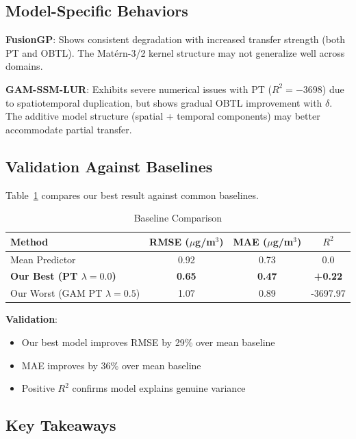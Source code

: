 \subsection{Model-Specific Behaviors}
\label{subsec:model_behaviors}

\textbf{FusionGP}: Shows consistent degradation with increased transfer strength (both PT and OBTL). The Matérn-3/2 kernel structure may not generalize well across domains.

\textbf{GAM-SSM-LUR}: Exhibits severe numerical issues with PT (\(R^2=-3698\)) due to spatiotemporal duplication, but shows gradual OBTL improvement with \(\delta\). The additive model structure (spatial + temporal components) may better accommodate partial transfer.

\subsection{Validation Against Baselines}
\label{sec:baseline_validation}

Table~\ref{tab:baseline_comparison} compares our best result against common baselines.

\begin{table}[htbp]
\centering
\caption{Baseline Comparison}
\label{tab:baseline_comparison}
\begin{tabular}{lccc}
\toprule
Method & RMSE (\(\mu\)g/m\(^3\)) & MAE (\(\mu\)g/m\(^3\)) & \(R^2\) \\
\midrule
Mean Predictor & 0.92 & 0.73 & 0.0 \\
\textbf{Our Best (PT \(\lambda=0.0\))} & \textbf{0.65} & \textbf{0.47} & \textbf{+0.22} \\
Our Worst (GAM PT \(\lambda=0.5\)) & 1.07 & 0.89 & -3697.97 \\
\bottomrule
\end{tabular}
\end{table}

\textbf{Validation}:
\begin{itemize}
    \item Our best model improves RMSE by 29\% over mean baseline
    \item MAE improves by 36\% over mean baseline
    \item Positive \(R^2\) confirms model explains genuine variance
\end{itemize}

\subsection{Key Takeaways}
\label{sec:key_takeaways}


